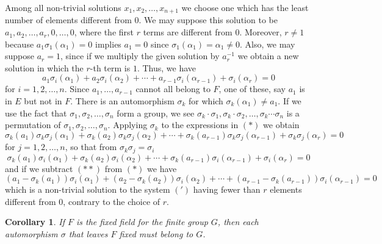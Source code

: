 \documentclass[11pt]{article}
\newtheorem{coro}{Corollary}
\theoremstyle{definition}
\begin{document}
Among all non-trivial solutions $x_1, x_2, \ldots, x_{n+1}$ we choose one which has the least number of elements different from $0$.
We may suppose this solution to be $a_1, a_2, \ldots, a_r, 0, \ldots, 0$, where the first $r$ terms are different from $0$.
Moreover, $r\not=1$ because $a_1 \sigma_1(\alpha_1) = 0$ implies $a_1 = 0$ since $\sigma_1(\alpha_1) = \alpha_1 \not= 0$.
Also, we may suppose $a_r = 1$, since if we multiply the given solution by $a_r^{-1}$ we obtain a new solution in which the $r$-th term is $1$.
Thus, we have
\begin{equation}
\tag{$*$}
a_1 \sigma_{i}(\alpha_1) + 
a_2 \sigma_{i}(\alpha_2) + 
\cdots +
a_{r-1} \sigma_{i}(\alpha_{r-1}) +
\sigma_{i}(\alpha_{r}) = 0
\end{equation}
for $i = 1,2,\ldots,n$.
Since $a_1, \ldots, a_{r-1}$ cannot all belong to $F$, one of these, say $a_1$ is in $E$ but not in $F$.
There is an automorphism $\sigma_k$ for which $\sigma_k(\alpha_1) \not= a_1$.
If we use the fact that $\sigma_1, \sigma_2, \ldots, \sigma_n$ form a group, we see $\sigma_k \cdot \sigma_1, \sigma_k \cdot \sigma_2, \ldots, \sigma_k \cdots \sigma_n$ is a permutation of $\sigma_1, \sigma_2, \ldots, \sigma_n$.
Applying $\sigma_k$ to the expressions in $(*)$ we obtain
\begin{equation*}
\sigma_k(a_1) \sigma_k \sigma_{j}(\alpha_1) + 
\sigma_k(a_2) \sigma_k \sigma_{j}(\alpha_2) + 
\cdots +
\sigma_k(a_{r-1}) \sigma_k \sigma_{j}(\alpha_{r-1}) +
\sigma_k \sigma_{j}(\alpha_{r}) = 0
\end{equation*}
for $j=1,2,\ldots,n$, so that from $\sigma_k \sigma_j = \sigma_i$
\begin{equation}
\tag{$**$}
\sigma_k(a_1) \sigma_{i}(\alpha_1) + 
\sigma_k(a_2) \sigma_{i}(\alpha_2) + 
\cdots +
\sigma_k(a_{r-1}) \sigma_{i}(\alpha_{r-1}) +
\sigma_{i}(\alpha_{r}) = 0
\end{equation}
and if we subtract $(**)$ from $(*)$ we have
\begin{equation*}
(a_1 - \sigma_k(a_1)) \sigma_{i}(\alpha_1) + 
(a_2 - \sigma_k(a_2)) \sigma_{i}(\alpha_2) + 
\cdots +
(a_{r-1} - \sigma_k(a_{r-1})) \sigma_{i}(\alpha_{r-1}) = 0
\end{equation*}
which is a non-trivial solution to the system $(')$ having fewer than $r$ elements different from $0$, contrary to the choice of $r$.


\begin{coro}
\label{coro:on}
If $F$ is the fixed field for the finite group $G$, then each automorphism $\sigma$ that leaves $F$ fixed must belong to $G$.
\end{coro}
\end{document}
